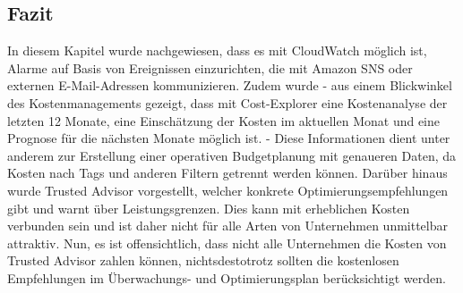 \subsection*{Fazit}
In diesem Kapitel wurde nachgewiesen, dass es mit CloudWatch möglich ist, Alarme auf Basis von Ereignissen einzurichten, die mit Amazon SNS oder externen E-Mail-Adressen kommunizieren. %
Zudem wurde - aus einem Blickwinkel des Kostenmanagements gezeigt, dass mit Cost-Explorer eine Kostenanalyse der letzten 12 Monate, eine Einschätzung der Kosten im aktuellen Monat und eine Prognose für die nächsten Monate möglich ist. - Diese Informationen dient unter anderem zur Erstellung einer operativen Budgetplanung mit genaueren Daten, da
Kosten nach Tags und anderen Filtern getrennt werden können.
Darüber hinaus wurde Trusted Advisor vorgestellt, welcher konkrete Optimierungsempfehlungen gibt und warnt über Leistungsgrenzen. Dies kann mit erheblichen Kosten verbunden sein und ist daher nicht für alle Arten von Unternehmen unmittelbar attraktiv. Nun, es ist offensichtlich, dass nicht alle Unternehmen die Kosten von Trusted Advisor zahlen können, nichtsdestotrotz sollten die kostenlosen Empfehlungen im Überwachungs- und Optimierungsplan berücksichtigt werden.

